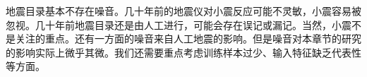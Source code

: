 地震目录基本不存在噪音。几十年前的地震仪对小震反应可能不灵敏，小震容易被忽视。几十年前地震目录还是由人工进行，可能会存在误记或漏记。当然，小震不是关注的重点。还有一方面的噪音来自人工地震的影响。但是噪音对本章节的研究的影响实际上微乎其微。我们还需要重点考虑训练样本过少、输入特征缺乏代表性等方面。



  


